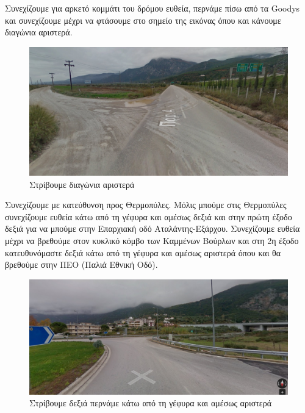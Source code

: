 Συνεχίζουμε για αρκετό κομμάτι του δρόμου ευθεία, περνάμε πίσω από τα Goodys και συνεχίζουμε μέχρι να φτάσουμε στο σημείο της εικόνας όπου και κάνουμε διαγώνια αριστερά. 
\begin{figure}[H]
\includegraphics[width=\textwidth]{images/lamia-athina/lamia/lamia_005.jpg}
\caption{Στρίβουμε διαγώνια αριστερά} 
\end{figure}

Συνεχίζουμε με κατεύθυνση προς Θερμοπύλες. Μόλις μπούμε στις Θερμοπύλες συνεχίζουμε ευθεία κάτω από τη γέφυρα και αμέσως δεξιά και στην πρώτη έξοδο δεξιά για να μπούμε στην Επαρχιακή οδό Αταλάντης-Εξάρχου. Συνεχίζουμε ευθεία μέχρι να βρεθούμε στον κυκλικό κόμβο των Καμμένων Βούρλων και στη 2η έξοδο κατευθυνόμαστε δεξιά κάτω από τη γέφυρα και αμέσως αριστερά όπου και θα βρεθούμε στην ΠΕΟ (Παλιά Εθνική Οδό).
\begin{figure}[H]
\includegraphics[width=\textwidth]{images/lamia-athina/lamia/lamia_006.jpg}
\caption{Στρίβουμε δεξιά περνάμε κάτω από τη γέφυρα και αμέσως αριστερά}  
\end{figure}

